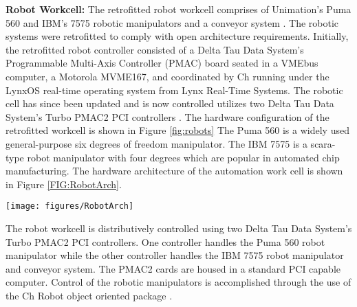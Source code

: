       \textbf{Robot Workcell:} 
      The retrofitted robot workcell comprises of Unimation's Puma 560 and IBM's 
        7575 robotic manipulators and a conveyor system 
        \cite{Pannuthesis,Hu,Pannu}. 
      The robotic systems were retrofitted to comply with open architecture
        requirements.
      Initially, the retrofitted robot controller consisted of a Delta Tau Data 
        System's Programmable Multi-Axis Controller (PMAC) board seated in a 
        VMEbus computer, a Motorola MVME167, and coordinated by Ch running under 
        the LynxOS real-time operating system from Lynx Real-Time Systems.
      The robotic cell has since been updated and is now controlled utilizes two 
        Delta Tau Data System's Turbo PMAC2 PCI controllers \cite{Delta}. 
      The hardware configuration of the retrofitted workcell is shown in Figure 
        \ref{fig:robots}
      The Puma 560 is a widely used general-purpose six degrees of freedom 
        manipulator.
      The IBM 7575 is a scara-type robot manipulator with four degrees which are 
        popular in automated chip manufacturing.
      The hardware architecture of the automation work cell is shown in
        Figure \ref{FIG:RobotArch}.
      \begin{figure*}[t!]
      \centerline{\texttt{[image: figures/RobotArch]}}
      \caption{The hardware architecture of the robot workcell with
               Puma 560 and IBM 7575 robots.}
      \label{FIG:RobotArch}
      \end{figure*}
      The robot workcell is distributively controlled using two Delta Tau
        Data System's Turbo PMAC2 PCI controllers.
      One controller handles the Puma 560 robot manipulator while the other
        controller handles the IBM 7575 robot manipulator and conveyor system.
      The PMAC2 cards are housed in a standard PCI capable computer.
      Control of the robotic manipulators is accomplished through the use
        of the Ch Robot object oriented package \cite{ielrobots_webpage}.
      

